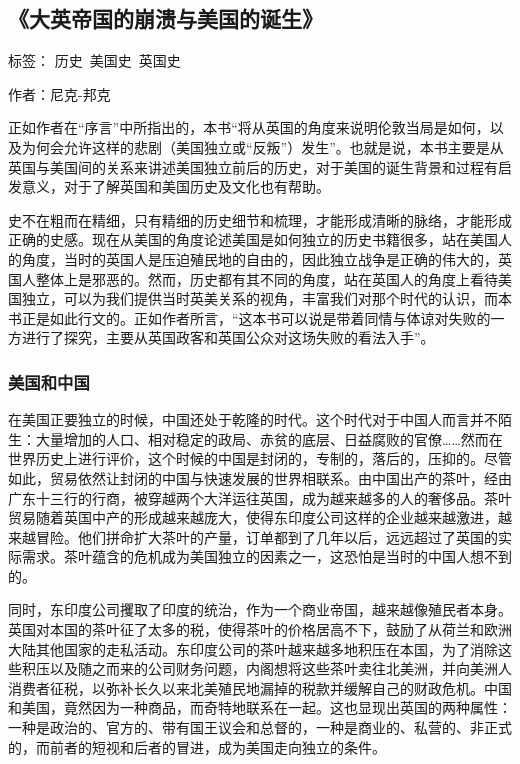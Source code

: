 \subsection{《大英帝国的崩溃与美国的诞生》}

标签： 历史\  美国史\  英国史

作者：尼克-邦克

正如作者在“序言”中所指出的，本书“将从英国的角度来说明伦敦当局是如何，以及为何会允许这样的悲剧（美国独立或“反叛”）发生”。也就是说，本书主要是从英国与美国间的关系来讲述美国独立前后的历史，对于美国的诞生背景和过程有启发意义，对于了解英国和美国历史及文化也有帮助。

史不在粗而在精细，只有精细的历史细节和梳理，才能形成清晰的脉络，才能形成正确的史感。现在从美国的角度论述美国是如何独立的历史书籍很多，站在美国人的角度，当时的英国人是压迫殖民地的自由的，因此独立战争是正确的伟大的，英国人整体上是邪恶的。然而，历史都有其不同的角度，站在英国人的角度上看待美国独立，可以为我们提供当时英美关系的视角，丰富我们对那个时代的认识，而本书正是如此行文的。正如作者所言，“这本书可以说是带着同情与体谅对失败的一方进行了探究，主要从英国政客和英国公众对这场失败的看法入手”。

\subsubsection{美国和中国}
在美国正要独立的时候，中国还处于乾隆的时代。这个时代对于中国人而言并不陌生：大量增加的人口、相对稳定的政局、赤贫的底层、日益腐败的官僚……然而在世界历史上进行评价，这个时候的中国是封闭的，专制的，落后的，压抑的。尽管如此，贸易依然让封闭的中国与快速发展的世界相联系。由中国出产的茶叶，经由广东十三行的行商，被穿越两个大洋运往英国，成为越来越多的人的奢侈品。茶叶贸易随着英国中产的形成越来越庞大，使得东印度公司这样的企业越来越激进，越来越冒险。他们拼命扩大茶叶的产量，订单都到了几年以后，远远超过了英国的实际需求。茶叶蕴含的危机成为美国独立的因素之一，这恐怕是当时的中国人想不到的。

同时，东印度公司攫取了印度的统治，作为一个商业帝国，越来越像殖民者本身。英国对本国的茶叶征了太多的税，使得茶叶的价格居高不下，鼓励了从荷兰和欧洲大陆其他国家的走私活动。东印度公司的茶叶越来越多地积压在本国，为了消除这些积压以及随之而来的公司财务问题，内阁想将这些茶叶卖往北美洲，并向美洲人消费者征税，以弥补长久以来北美殖民地漏掉的税款并缓解自己的财政危机。中国和美国，竟然因为一种商品，而奇特地联系在一起。这也显现出英国的两种属性：一种是政治的、官方的、带有国王议会和总督的，一种是商业的、私营的、非正式的，而前者的短视和后者的冒进，成为美国走向独立的条件。

